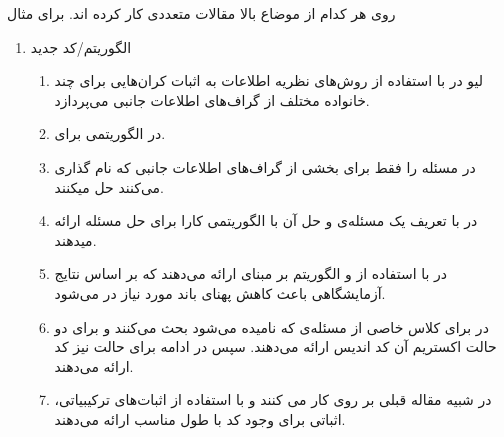 روی هر کدام از موضاع بالا مقالات متعددی کار کرده اند. برای مثال
\begin{enumerate}
	\item الگوریتم‌/کد جدید
	\begin{enumerate}
		\item 
		لیو در
		\cite{8278015}
		با استفاده از روش‌های نظریه اطلاعات به اثبات کران‌هایی برای چند خانواده مختلف از گراف‌های اطلاعات جانبی می‌پردازد.
		\item 
	در
	\cite{10313405}
	الگوریتمی برای.
	\item
	در
	\cite{8871209}
	مسئله را فقط برای بخشی از گراف‌های اطلاعات جانبی که
	نام گذاری می‌کنند حل میکنند.
	\item
	در
	\cite{9759449}
	با تعریف یک مسئله‌ی
	و حل آن با 
	الگوریتمی کارا برای حل مسئله ارائه میدهند.
	\item
	در
	\cite{8682270}
	با استفاده از
	\picod
	و الگوریتم بر مبنای
	 ارائه می‌دهند که بر اساس نتایج آزمایشگاهی باعث کاهش پهنای باند مورد نیاز در
	 می‌شود.
	 \item
	 در
	 \cite{sasi2019pliable}
	 برای کلاس خاصی از مسئله‌ی
	 \picod
	 که
	 نامیده می‌شود بحث می‌کنند و برای دو حالت اکستریم آن کد اندیس ارائه می‌دهند. سپس در ادامه برای حالت
	 نیز کد ارائه می‌دهند.
	 \item 
	 در
	 \cite{8613483}
	 شبیه مقاله قبلی بر روی
	 کار می کنند و با استفاده از اثبات‌های ترکیبیاتی، اثباتی برای وجود کد با طول مناسب ارائه می‌دهند.
	\end{enumerate}
	 

\end{enumerate}

